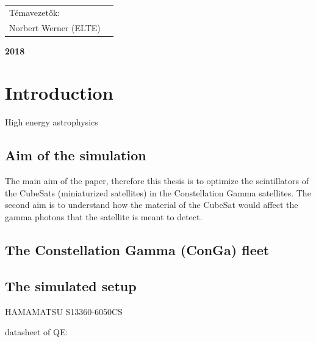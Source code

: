 \documentclass[12pt, a4paper,titlepage]{article}
\numberwithin{equation}{section}
\numberwithin{figure}{section}
\begin{document}
\begin{titlepage}
\begin{center}
\vspace{4 cm}
\end{center}

\begin{center}
\begin{tabular}{ll}
\centerline{ Témavezetők: } \\
\centerline{ Norbert Werner (ELTE)}
\end{tabular}
\end{center}
\begin{center}

\vspace{2.5 cm}
\large \textbf {2018}\\
\end{center}
\end{titlepage}
\tableofcontents
{}



\pagebreak
{}
\setcounter{page}{1}




\section{Introduction}

High energy astrophysics

\subsection{Aim of the simulation}

The main aim of the paper, therefore this thesis is to optimize the scintillators of the CubeSats (miniaturized satellites) in the Constellation Gamma satellites. The second aim is to understand how the material of the CubeSat would affect the gamma photons that the satellite is meant to detect.

\subsection{The Constellation Gamma (ConGa) fleet}

\subsection{The simulated setup}


HAMAMATSU S13360-6050CS

datasheet of QE:
\end{document}

